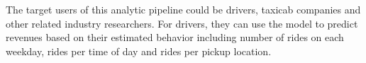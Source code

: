 \documentclass[twoside,11pt]{article}
\begin{document}
The target users of this analytic pipeline could be drivers, taxicab companies and other related industry researchers. For drivers, they can use the model to predict revenues based on their estimated behavior including number of rides on each weekday, rides per time of day and rides per pickup location.



\end{document}
